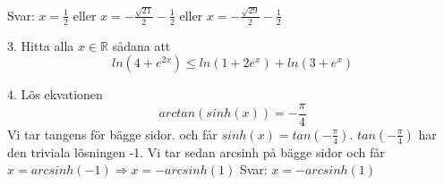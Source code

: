 \documentclass{article}
\begin{document}
  Svar: $x = \frac{1}{2}$ eller $x = -\frac{\sqrt{21}}{2} - \frac{1}{2}$ eller $x = -\frac{\sqrt{29}}{2} - \frac{1}{2}$\newline \newline
  
  3. Hitta alla $x \in \mathbb{R}$ sådana att 
  \begin{equation}
      ln(4 + e^{2x}) \leq ln(1 + 2e^x) + ln(3 + e^x)
  \end{equation}
  
  4. Lös ekvationen 
  \begin{equation}
      arctan(sinh(x)) = -\frac{\pi}{4}
  \end{equation}
  Vi tar tangens för bägge sidor. och får $sinh(x) = tan(-\frac{\pi}{4})$. $tan(-\frac{\pi}{4})$ har den triviala lösningen -1. Vi tar sedan arcsinh på bägge sidor och får $x = arcsinh(-1) \Rightarrow x = -arcsinh(1)$ \newline \newline
  Svar: $x = -arcsinh(1)$
  
\end{document}
